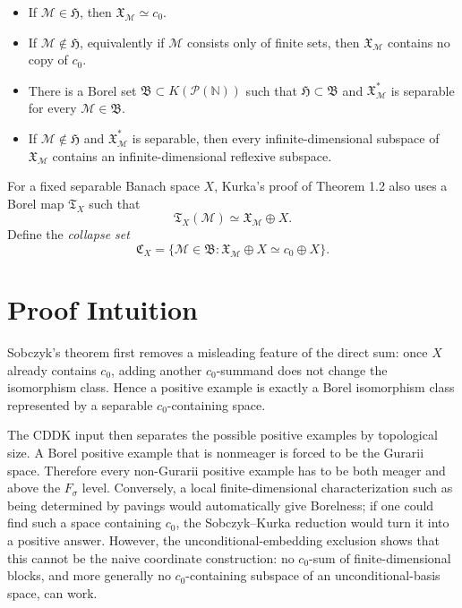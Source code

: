 \documentclass[11pt]{article}
\begin{document}
\begin{itemize}
\item If \(\mathcal M\in\mathfrak H\), then \(\mathfrak X_{\mathcal M}\simeq c_0\).
\item If \(\mathcal M\notin\mathfrak H\), equivalently if \(\mathcal M\) consists only of finite sets, then \(\mathfrak X_{\mathcal M}\) contains no copy of \(c_0\).
\item There is a Borel set \(\mathfrak B\subset K(\mathcal P(\mathbb N))\) such that \(\mathfrak H\subset\mathfrak B\) and \(\mathfrak X_{\mathcal M}^*\) is separable for every \(\mathcal M\in\mathfrak B\).
\item If \(\mathcal M\notin\mathfrak H\) and \(\mathfrak X_{\mathcal M}^*\) is separable, then every infinite-dimensional subspace of \(\mathfrak X_{\mathcal M}\) contains an infinite-dimensional reflexive subspace.
\end{itemize}

For a fixed separable Banach space \(X\), Kurka's proof of Theorem 1.2 also uses a Borel map \(\mathfrak T_X\) such that
\[
  \mathfrak T_X(\mathcal M)\simeq \mathfrak X_{\mathcal M}\oplus X.
\]
Define the \emph{collapse set}
\[
  \mathfrak C_X
  =
  \{\mathcal M\in\mathfrak B:
  \mathfrak X_{\mathcal M}\oplus X\simeq c_0\oplus X\}.
\]

\section*{Proof Intuition}

Sobczyk's theorem first removes a misleading feature of the direct sum: once
\(X\) already contains \(c_0\), adding another \(c_0\)-summand does not change
the isomorphism class.  Hence a positive example is exactly a Borel
isomorphism class represented by a separable \(c_0\)-containing space.

The CDDK input then separates the possible positive examples by topological
size.  A Borel positive example that is nonmeager is forced to be the Gurarii
space.  Therefore every non-Gurarii positive example has to be both meager and
above the \(F_\sigma\) level.  Conversely, a local finite-dimensional
characterization such as being determined by pavings would automatically give
Borelness; if one could find such a space containing \(c_0\), the
Sobczyk--Kurka reduction would turn it into a positive answer.  However, the
unconditional-embedding exclusion shows that this cannot be the naive
coordinate construction: no \(c_0\)-sum of finite-dimensional blocks, and more
generally no \(c_0\)-containing subspace of an unconditional-basis space, can
work.
\end{document}
